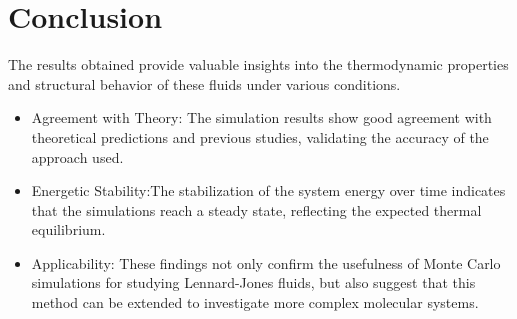 \documentclass[a4paper,12pt]{article}
\begin{document}
\section{Conclusion}
The results obtained provide valuable insights into the thermodynamic properties and structural behavior of these fluids under various conditions.
\begin{multicols}{2}
  
    \begin{itemize}
        \item Agreement with Theory: The simulation results show good agreement with theoretical predictions and previous studies, validating the accuracy of the approach used.
        \item Energetic Stability:The stabilization of the system energy over time indicates that the simulations reach a steady state, reflecting the expected thermal equilibrium.
        \item  Applicability: These findings not only confirm the usefulness of Monte Carlo simulations for studying Lennard-Jones fluids, but also suggest that this method can be extended to investigate more complex molecular systems.
    \end{itemize}
\end{multicols}




\end{document}
